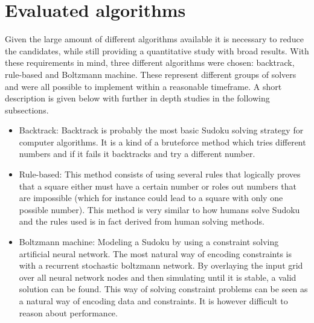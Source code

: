 \documentclass[a4paper,11pt]{kth-mag}
\begin{document}
\section{Evaluated algorithms}
Given the large amount of different algorithms available it is necessary to reduce the candidates, while still providing a quantitative study with broad results.
With these requirements in mind, three different algorithms were chosen: backtrack, rule-based and Boltzmann machine.
These represent different groups of solvers and were all possible to implement within a reasonable timeframe.
A short description is given below with further in depth studies in the following subsections.
\begin{itemize}
    \item Backtrack: Backtrack is probably the most basic Sudoku solving strategy for computer algorithms.
It is a kind of a bruteforce method which tries different numbers and if it fails it backtracks and try a different number.
    \item Rule-based: This method consists of using several rules that logically proves that a square either must have a certain number or roles out numbers that are impossible (which for instance could lead to a square with only one possible number).
This method is very similar to how humans solve Sudoku and the rules used is in fact derived from human solving methods.
    \item Boltzmann machine: Modeling a Sudoku by using a constraint solving artificial neural network.
The most natural way of encoding constraints is with a recurrent stochastic boltzmann network.
By overlaying the input grid over all neural network nodes and then simulating until it is stable, a valid solution can be found.
This way of solving constraint problems can be seen as a natural way of encoding data and constraints.
It is however difficult to reason about performance.
\end{itemize}
\end{document}
